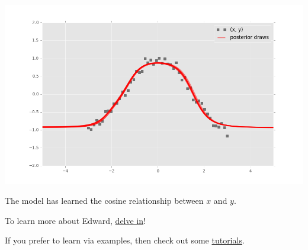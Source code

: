 \includegraphics[width=700px]{images/getting-started-fig1.png}

The model has learned the cosine relationship between $x$ and $y$.

To learn more about Edward, \href{delving-in.html}{delve in}!

If you prefer to learn via examples, then check out some
\href{tutorials.html}{tutorials}.
